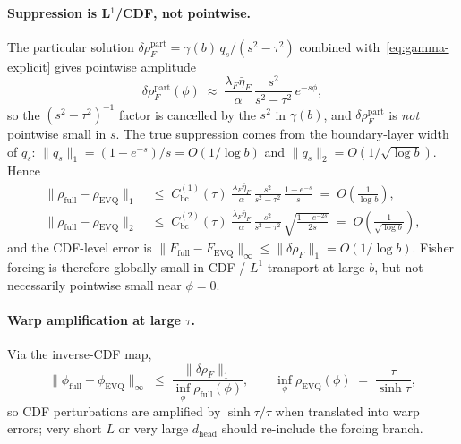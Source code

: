 \paragraph{Suppression is L$^1$/CDF, not pointwise.} The particular solution $\delta\rho_{F}^{\mathrm{part}} = \gamma(b)\,q_s/(s^2-\tau^2)$ combined with~\eqref{eq:gamma-explicit} gives pointwise amplitude
\begin{equation}
\delta\rho_{F}^{\mathrm{part}}(\phi) \;\approx\; \frac{\lambda_F\bar\eta_F}{\alpha}\,\frac{s^2}{s^2-\tau^2}\,e^{-s\phi},
\label{eq:delta-rho-F-pointwise}
\end{equation}
so the $(s^2-\tau^2)^{-1}$ factor is cancelled by the $s^2$ in $\gamma(b)$, and $\delta\rho_{F}^{\mathrm{part}}$ is \emph{not} pointwise small in $s$. The true suppression comes from the boundary-layer width of $q_s$: $\|q_s\|_1 = (1-e^{-s})/s = O(1/\log b)$ and $\|q_s\|_2 = O(1/\sqrt{\log b})$. Hence
\begin{align}
\|\rho_{\mathrm{full}}-\rho_{\mathrm{EVQ}}\|_1 \;&\le\; C_{\mathrm{bc}}^{(1)}(\tau)\;\frac{\lambda_F\bar\eta_F}{\alpha}\,\frac{s^2}{s^2-\tau^2}\,\frac{1-e^{-s}}{s} \;=\; O\!\left(\tfrac{1}{\log b}\right),\label{eq:tether-L1-correct}\\
\|\rho_{\mathrm{full}}-\rho_{\mathrm{EVQ}}\|_2 \;&\le\; C_{\mathrm{bc}}^{(2)}(\tau)\;\frac{\lambda_F\bar\eta_F}{\alpha}\,\frac{s^2}{s^2-\tau^2}\,\sqrt{\tfrac{1-e^{-2s}}{2s}} \;=\; O\!\left(\tfrac{1}{\sqrt{\log b}}\right),
\label{eq:tether-L2-correct}
\end{align}
and the CDF-level error is $\|F_{\mathrm{full}}-F_{\mathrm{EVQ}}\|_\infty \le \|\delta\rho_{F}\|_1 = O(1/\log b)$. Fisher forcing is therefore globally small in CDF / $L^1$ transport at large $b$, but not necessarily pointwise small near $\phi{=}0$.

\paragraph{Warp amplification at large $\tau$.} Via the inverse-CDF map,
\begin{equation}
\|\phi_{\mathrm{full}}-\phi_{\mathrm{EVQ}}\|_\infty \;\le\; \frac{\|\delta\rho_{F}\|_1}{\inf_\phi \rho_{\mathrm{full}}(\phi)}, \qquad \inf_\phi \rho_{\mathrm{EVQ}}(\phi) \;=\; \frac{\tau}{\sinh\tau},
\label{eq:warp-bound}
\end{equation}
so CDF perturbations are amplified by $\sinh\tau/\tau$ when translated into warp errors; very short $L$ or very large $d_{\mathrm{head}}$ should re-include the forcing branch.

